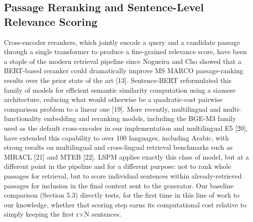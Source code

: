 \documentclass[pdflatex,sn-basic,Numbered]{sn-jnl}
\begin{document}
\subsection{Passage Reranking and Sentence-Level Relevance Scoring}
Cross-encoder rerankers, which jointly encode a query and a candidate passage through a single transformer to produce a fine-grained relevance score, have been a staple of the modern retrieval pipeline since Nogueira and Cho showed that a BERT-based reranker could dramatically improve MS MARCO passage-ranking results over the prior state of the art [13]. Sentence-BERT reformulated this family of models for efficient semantic similarity computation using a siamese architecture, reducing what would otherwise be a quadratic-cost pairwise comparison problem to a linear one [19]. More recently, multilingual and multi-functionality embedding and reranking models, including the BGE-M3 family used as the default cross-encoder in our implementation and multilingual E5 [20], have extended this capability to over 100 languages, including Arabic, with strong results on multilingual and cross-lingual retrieval benchmarks such as MIRACL [21] and MTEB [22]. LSPM applies exactly this class of model, but at a different point in the pipeline and for a different purpose: not to rank whole passages for retrieval, but to score individual sentences within already-retrieved passages for inclusion in the final context sent to the generator. Our baseline comparison (Section 5.3) directly tests, for the first time in this line of work to our knowledge, whether that scoring step earns its computational cost relative to simply keeping the first r$\times$N sentences.
\end{document}
